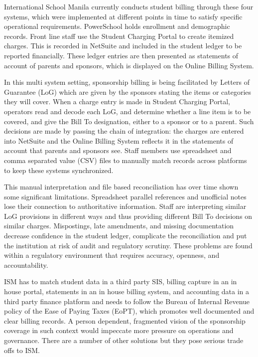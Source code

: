 \documentclass[12pt,a4paper]{article}
\begin{document}
International School Manila currently conducts student billing through these four systems, which were implemented at different points in time to satisfy specific operational requirements. PowerSchool holds enrollment and demographic records. Front line staff use the Student Charging Portal to create itemized charges. This is recorded in NetSuite and included in the student ledger to be reported financially. These ledger entries are then presented as statements of account of parents and sponsors, which is displayed on the Online Billing System.

In this multi system setting, sponsorship billing is being facilitated by Letters of Guarantee (LoG) which are given by the sponsors stating the items or categories they will cover. When a charge entry is made in Student Charging Portal, operators read and decode each LoG, and determine whether a line item is to be covered, and give the Bill To designation, either to a sponsor or to a parent. Such decisions are made by passing the chain of integration: the charges are entered into NetSuite and the Online Billing System reflects it in the statements of account that parents and sponsors see. Staff members use spreadsheet and comma separated value (CSV) files to manually match records across platforms to keep these systems synchronized.

This manual interpretation and file based reconciliation has over time shown some significant limitations. Spreadsheet parallel references and unofficial notes lose their connection to authoritative information. Staff are interpreting similar LoG provisions in different ways and thus providing different Bill To decisions on similar charges. Mispostings, late amendments, and missing documentation decrease confidence in the student ledger, complicate the reconciliation and put the institution at risk of audit and regulatory scrutiny. These problems are found within a regulatory environment that requires accuracy, openness, and accountability.

ISM has to match student data in a third party SIS, billing capture in an in house portal, statements in an in house billing system, and accounting data in a third party finance platform and needs to follow the Bureau of Internal Revenue policy of the Ease of Paying Taxes (EoPT), which promotes well documented and clear billing records. A person dependent, fragmented vision of the sponsorship coverage in such context would impeccate more pressure on operations and governance. There are a number of other solutions but they pose serious trade offs to ISM.
\end{document}
